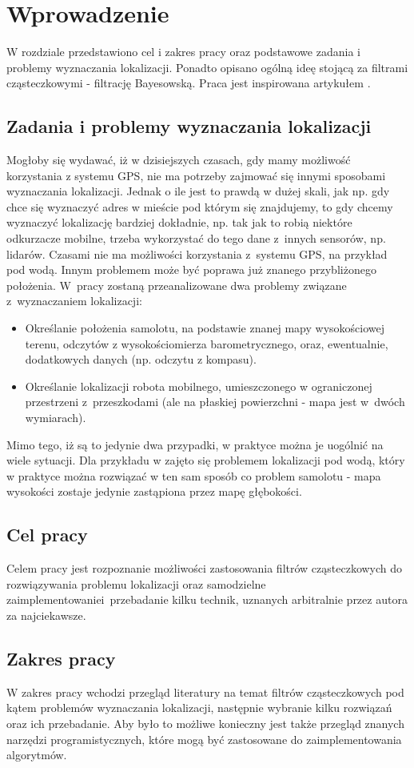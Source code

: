 \chapter{Wprowadzenie}
W rozdziale przedstawiono cel i zakres pracy oraz podstawowe zadania i problemy wyznaczania lokalizacji. Ponadto opisano ogólną ideę stojącą za filtrami cząsteczkowymi - filtrację Bayesowską. Praca jest inspirowana artykułem \cite{appl3}.
\section{Zadania i problemy wyznaczania lokalizacji}
Mogłoby się wydawać, iż w dzisiejszych czasach, gdy mamy możliwość korzystania z systemu GPS, nie ma potrzeby zajmować się innymi sposobami wyznaczania lokalizacji. Jednak o ile jest to prawdą w dużej skali, jak np. gdy chce się wyznaczyć adres w mieście pod którym się znajdujemy, to gdy chcemy wyznaczyć lokalizację bardziej dokładnie, np. tak jak to robią niektóre odkurzacze mobilne, trzeba wykorzystać do tego dane z~innych sensorów, np. lidarów. Czasami nie ma możliwości korzystania z~systemu GPS, na przykład pod wodą. Innym problemem może być poprawa już znanego przybliżonego położenia. W~pracy zostaną przeanalizowane dwa problemy związane z~wyznaczaniem lokalizacji:
\begin{itemize}
	\item Określanie położenia samolotu, na podstawie znanej mapy wysokościowej terenu, odczytów z wysokościomierza barometrycznego, oraz, ewentualnie, dodatkowych danych (np. odczytu z kompasu). 
	\item Określanie lokalizacji robota mobilnego, umieszczonego w ograniczonej przestrzeni z~przeszkodami (ale na płaskiej powierzchni - mapa jest w~dwóch wymiarach).
\end{itemize}
Mimo tego, iż są to jedynie dwa przypadki, w praktyce można je uogólnić na wiele sytuacji. Dla przykładu w \cite{underwater_pf} zajęto się problemem lokalizacji pod wodą, który w praktyce można rozwiązać w ten sam sposób co problem samolotu - mapa wysokości zostaje jedynie zastąpiona przez mapę głębokości.
\section{Cel pracy}
Celem pracy jest rozpoznanie możliwości zastosowania filtrów cząsteczkowych do rozwiązywania problemu lokalizacji oraz samodzielne zaimplementowanie\break i~przebadanie kilku technik, uznanych arbitralnie przez autora za najciekawsze.
\section{Zakres pracy}
W zakres pracy wchodzi przegląd literatury na temat filtrów cząsteczkowych pod kątem problemów wyznaczania lokalizacji, następnie wybranie kilku rozwiązań oraz ich przebadanie. Aby było to możliwe konieczny jest także przegląd znanych narzędzi programistycznych, które mogą być zastosowane do zaimplementowania algorytmów.

